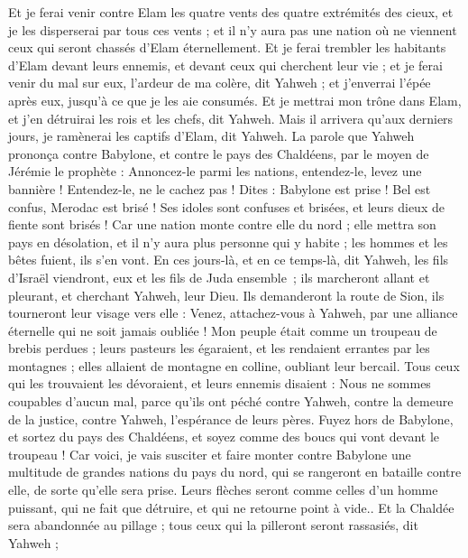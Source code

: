 \begin{multicols}{2}
Et je ferai venir contre Elam les quatre vents des quatre extrémités des cieux, et je les disperserai par tous ces vents ; et il n'y aura pas une nation où ne viennent ceux qui seront chassés d'Elam éternellement.
Et je ferai trembler les habitants d'Elam devant leurs ennemis, et devant ceux qui cherchent leur vie ; et je ferai venir du mal sur eux, l'ardeur de ma colère, dit Yahweh ; et j'enverrai l'épée après eux, jusqu'à ce que je les aie consumés.
Et je mettrai mon trône dans Elam, et j'en détruirai les rois et les chefs, dit Yahweh.
Mais il arrivera qu'aux derniers jours, je ramènerai les captifs d'Elam, dit Yahweh.
\VerseOne{}La parole que Yahweh prononça contre Babylone, et contre le pays des Chaldéens, par le moyen de Jérémie le prophète :
Annoncez-le parmi les nations, entendez-le, levez une bannière ! Entendez-le, ne le cachez pas ! Dites : Babylone est prise ! Bel est confus, Merodac est brisé ! Ses idoles sont confuses et brisées, et leurs dieux de fiente sont brisés !
Car une nation monte contre elle du nord ; elle mettra son pays en désolation, et il n'y aura plus personne qui y habite ; les hommes et les bêtes fuient, ils s'en vont.
En ces jours-là, et en ce temps-là, dit Yahweh, les fils d’Israël viendront, eux et les fils de Juda ensemble ; ils marcheront allant et pleurant, et cherchant Yahweh, leur Dieu.
Ils demanderont la route de Sion, ils tourneront leur visage vers elle : Venez, attachez-vous à Yahweh, par une alliance éternelle qui ne soit jamais oubliée !
Mon peuple était comme un troupeau de brebis perdues ; leurs pasteurs les égaraient, et les rendaient errantes par les montagnes ; elles allaient de montagne en colline, oubliant leur bercail.
Tous ceux qui les trouvaient les dévoraient, et leurs ennemis disaient : Nous ne sommes coupables d'aucun mal, parce qu'ils ont péché contre Yahweh, contre la demeure de la justice, contre Yahweh, l'espérance de leurs pères.
Fuyez hors de Babylone, et sortez du pays des Chaldéens, et soyez comme des boucs qui vont devant le troupeau !
Car voici, je vais susciter et faire monter contre Babylone une multitude de grandes nations du pays du nord, qui se rangeront en bataille contre elle, de sorte qu'elle sera prise. Leurs flèches seront comme celles d’un homme puissant, qui ne fait que détruire, et qui ne retourne point à vide..
Et la Chaldée sera abandonnée au pillage ; tous ceux qui la pilleront seront rassasiés, dit Yahweh ;

\end{multicols}
